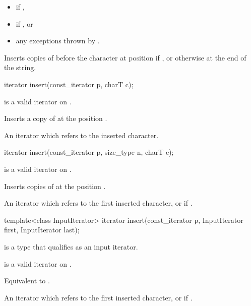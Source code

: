 \begin{itemdescr}
\pnum
\throws
\begin{itemize}
\item {} if ,
\item {} if , or
\item any exceptions thrown by .
\end{itemize}
\pnum
\effects
Inserts  copies of  before the character at position 
if ,
or otherwise at the end of the string.
\end{itemdescr}

%
\begin{itemdecl}
iterator insert(const_iterator p, charT c);
\end{itemdecl}

\begin{itemdescr}
\pnum
\expects
{} is a valid iterator on
.

\pnum
\effects
Inserts a copy of  at the position .

\pnum
\returns
An iterator which refers to the inserted character.
\end{itemdescr}

%
\begin{itemdecl}
iterator insert(const_iterator p, size_type n, charT c);
\end{itemdecl}

\begin{itemdescr}
\pnum
\expects
{} is a valid iterator on
.

\pnum
\effects
Inserts  copies of  at the position .

\pnum
\returns An iterator which refers to  the first inserted character, or
 if .
\end{itemdescr}

%
\begin{itemdecl}
template<class InputIterator>
  iterator insert(const_iterator p, InputIterator first, InputIterator last);
\end{itemdecl}

\begin{itemdescr}
\pnum
\constraints
{} is a type that qualifies as an input
iterator.

\pnum
\expects
{} is a valid iterator on
.

\pnum
\effects
Equivalent to
.

\pnum
\returns An iterator which refers to the first inserted character, or
 if .
\end{itemdescr}

